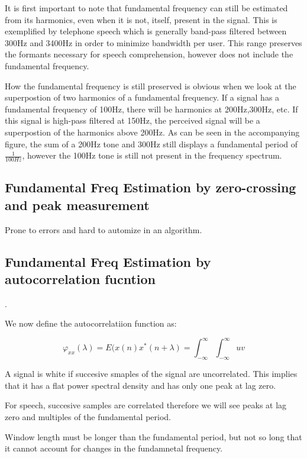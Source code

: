 	It is first important to note that fundamental frequency can still be estimated from its harmonics, even when it is not, itself, present in the signal.  This is exemplified by telephone speech which is generally band-pass filtered between 300Hz and 3400Hz in order to minimize bandwidth per user.  This range preserves the formants necessary for speech comprehension, however does not include the fundamental frequency.  
	
	How the fundamental frequency is still preserved is obvious when we look at the superpostion of two harmonics of a fundamental frequency.  If a signal has a fundamental frequency of 100Hz, there will be harmonics at 200Hz,300Hz, etc.  If this signal is high-pass filtered at 150Hz, the perceived signal will be a superpostion of the harmonics above 200Hz.  As can be seen in the accompanying figure, the sum of a 200Hz tone and 300Hz still displays a fundamental period of \begin{math}\frac{1}{100Hz}\end{math}, however the 100Hz tone is still not present in the frequency spectrum.

\vspace{-5mm} %


\subsection {Fundamental Freq Estimation by zero-crossing and peak measurement}  Prone to errors and hard to automize in an algorithm.  



\subsection {Fundamental Freq Estimation by autocorrelation fucntion}.  

We now define the autocorrelatiion function as:

\begin{equation}\varphi_{xx}(\lambda) = E(x(n)x^*(n + \lambda) = \int^{\infty}_{-\infty} \int^{\infty}_{-\infty}
uv\end{equation}


A signal is white if succesive smaples of the signal are uncorrelated.  This implies that it has a flat power spectral density and has only one peak at lag zero.

For speech, succesive samples are correlated therefore we will see peaks at lag zero and multiples of the fundamental period.  

Window length must be longer than the fundamental period, but not so long that it cannot account for changes in the fundamnetal frequency. 

